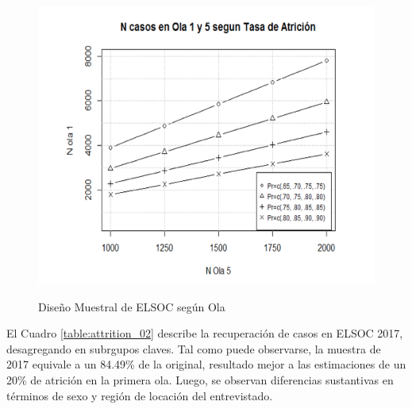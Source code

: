 \documentclass[12pt]{report}
\begin{document}
\begin{figure}[H]
	\begin{center}
		\caption{Diseño Muestral de ELSOC según Ola}
		\label{fig:attrition1}
		\includegraphics[width=15cm,height=10cm]{attrition_01}
	\end{center}
\end{figure}

El Cuadro \ref{table:attrition_02} describe la recuperación de casos en ELSOC 2017, desagregando en subrgupos claves. Tal como puede observarse, la muestra de 2017 equivale a un 84.49\% de la original, resultado mejor a las estimaciones de un 20\% de atrición en la primera ola. Luego, se observan diferencias sustantivas en términos de sexo y región de locación del entrevistado. \\
\end{document}
